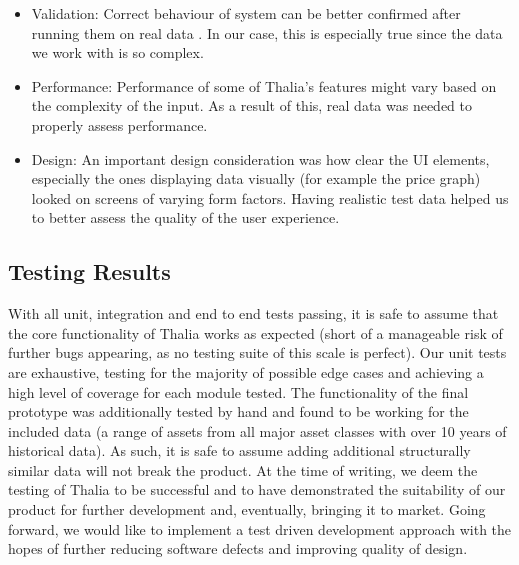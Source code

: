 \documentclass[main.tex]{subfiles}
\begin{document}
\begin{itemize}

\item Validation:
Correct behaviour of system can be better confirmed after running them on real data \cite{liveData}. In our case, this is especially true since the data we work with is so complex.

\item Performance:
Performance of some of Thalia's features might vary based on the complexity of the input. As a result of this, real data was needed to properly assess performance.

\item Design:
An important design consideration was how clear the UI elements, especially the ones displaying data visually (for example the price graph) looked on screens of varying form factors. Having realistic test data helped us to better assess the quality of the user experience.

\end{itemize}
 

\subsection{Testing Results}

With all unit, integration and end to end tests passing, it is safe to assume that the core functionality of Thalia works as expected (short of a manageable risk of further bugs appearing, as no testing suite of this scale is perfect). Our unit tests are exhaustive, testing for the majority of possible edge cases and achieving a high level of coverage for each module tested. The functionality of the final prototype was additionally tested by hand and found to be working for the included data (a range of assets from all major asset classes with over 10 years of historical data). As such, it is safe to assume adding additional structurally similar data will not break the product.
At the time of writing, we deem the testing of Thalia to be successful and to have demonstrated the suitability of our product for further development and, eventually, bringing it to market. Going forward, we would like to implement a test driven development approach with the hopes of further reducing software defects and  improving quality of design\cite{TDD}.
\end{document}
